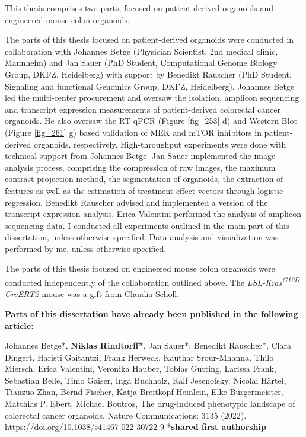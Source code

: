 \begin{flushleft}
This thesis comprises two parts, focused on patient-derived organoids and engineered mouse colon organoids. 
\bigbreak

The parts of this thesis focused on patient-derived organoids were conducted in collaboration with Johannes Betge (Physician Scientist, 2nd medical clinic, Mannheim) and Jan Sauer (PhD Student, Computational Genome Biology Group, DKFZ, Heidelberg) with support by Benedikt Rauscher (PhD Student, Signaling and functional Genomics Group, DKFZ, Heidelberg). 
\smallbreak
Johannes Betge led the multi-center procurement and oversaw the isolation, amplicon sequencing and transcript expression measurements of patient-derived colorectal cancer organoids. He also oversaw the RT-qPCR (Figure \ref{fig_253} d) and Western Blot (Figure \ref{fig_261} g) based validation of MEK and mTOR inhibitors in patient-derived organoids, respectively. High-throughput experiments were done with technical support from Johannes Betge. 
\smallbreak
Jan Sauer implemented the image analysis process, comprising the compression of raw images, the maximum contrast projection method, the segmentation of organoids, the extraction of features as well as the estimation of treatment effect vectors through logistic regression. 
\smallbreak
Benedikt Rauscher advised and implemented a version of the transcript expression analysis. 
\smallbreak
Erica Valentini performed the analysis of amplicon sequencing data.
\smallbreak
I conducted all experiments outlined in the main part of this dissertation, unless otherwise specified. Data analysis and visualization was performed by me, unless otherwise specified. 
\bigbreak

The parts of this thesis focused on engineered mouse colon organoids were conducted independently of the collaboration outlined above. The \textit{LSL-Kras\textsuperscript{G12D} CreERT2} mouse was a gift from Claudia Scholl.
\bigbreak

\textbf{Parts of this dissertation have already been published in the following article:}
\bigbreak

Johannes Betge*, \textbf{Niklas Rindtorff*}, Jan Sauer*, Benedikt Rauscher*, Clara Dingert, Haristi Gaitantzi, Frank Herweck, Kauthar Srour-Mhanna, Thilo Miersch, Erica Valentini, Veronika Hauber, Tobias Gutting, Larissa Frank, Sebastian Belle, Timo Gaiser, Inga Buchholz, Ralf Jesenofsky, Nicolai Härtel, Tianzuo Zhan, Bernd Fischer, Katja Breitkopf-Heinlein, Elke Burgermeister, Matthias P. Ebert, Michael Boutros, The drug-induced phenotypic landscape of colorectal cancer organoids. Nature Communications; 3135 (2022). https://doi.org/10.1038/s41467-022-30722-9 *\textbf{shared first authorship}


\end{flushleft}
